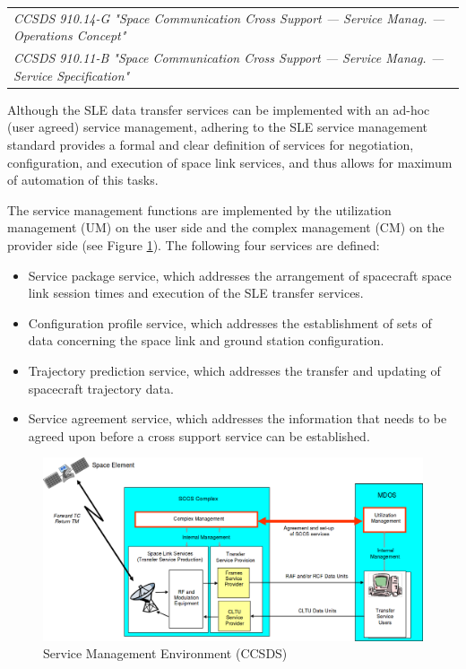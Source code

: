 \begin{tabular}{l}
\textit{CCSDS 910.14-G "Space Communication Cross Support — Service Manag. — Operations Concept" \cite{CCSDS-910.14-G}} \\
\textit{CCSDS 910.11-B "Space Communication Cross Support — Service Manag. — Service Specification" \cite{CCSDS-910.11-B}} \\
\end{tabular}

Although the SLE data transfer services can be implemented with an ad-hoc (user agreed) service management, adhering to the SLE service management standard provides a formal and clear definition of services for negotiation, configuration, and execution of space link services, and thus allows for maximum of automation of this tasks. 

The service management functions are implemented by the utilization management (UM) on the user side and the complex management (CM) on the provider side (see Figure \ref{fig:Service Management Environment}). The following four services are defined:

\begin{itemize}
\item Service package service, which addresses the arrangement of spacecraft space link session times and execution of the SLE transfer services.
\item Configuration profile service, which addresses the establishment of sets of data concerning the space link and ground station configuration.
\item Trajectory prediction service, which addresses the transfer and updating of spacecraft trajectory data.
\item Service agreement service, which addresses the information that needs to be agreed upon before a cross support service can be established.
\end{itemize}

\begin{figure}[h]
\centering\includegraphics[scale=0.3]{fig/service_management_environment}
\caption{Service Management Environment (CCSDS)}
\label{fig:Service Management Environment}
\end{figure}

